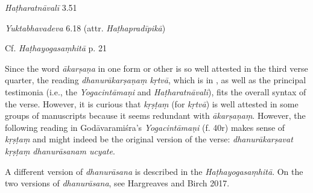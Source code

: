\begin{ekdosis}
\begin{testimonia}[hp01_025]
\emph{Haṭharatnāvalī} 3.51

\begin{versinnote}
\tl{\var{ākarṣaṇaṃ kṛtvā ] ākarṣaṇākṛṣṭaṃ P,T,t1}\\!}
\end{versinnote}

\emph{Yuktabhavadeva} 6.18 (attr. \emph{Haṭhapradīpikā})

\begin{versinnote}
\end{versinnote}

Cf. \emph{Haṭhayogasaṃhitā} p. 21

\begin{versinnote}
\end{versinnote}

\end{testimonia}

\begin{philcomm}[hp01_025]
Since the word \emph{ākarṣaṇa} in one form or other is so well attested in the third verse quarter, the reading \emph{dhanurākarṣaṇaṃ kṛtvā}, which is in \epsilonTwo, as well as the principal testimonia (i.e., the \emph{Yogacintāmaṇi} and \emph{Haṭharatnāvalī}), fits the overall syntax of the verse. However, it is curious that \emph{kṛṣṭaṃ} (for \emph{kṛtvā}) is well attested in some groups of manuscripts because it seems redundant with \emph{ākarṣaṇaṃ}. However, the following reading in 
Godāvaramiśra's \emph{Yogacintāmaṇi} (f. 40r) makes sense of \emph{kṛṣṭaṃ} and might indeed be the original version of the verse: \emph{dhanurākarṣavat kṛṣṭaṃ dhanurāsanam ucyate}.

A different version of \emph{dhanurāsana} is described in the \emph{Haṭhayogasaṃhitā}. On the two versions of \emph{dhanurāsana}, see Hargreaves and Birch 2017.


\end{philcomm}
\end{ekdosis}
